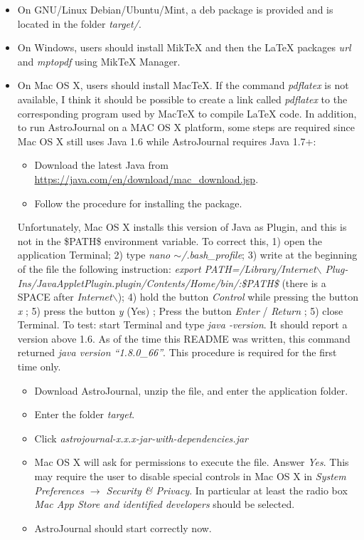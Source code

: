 \begin{itemize}
 \item On GNU/Linux Debian/Ubuntu/Mint, a deb package is provided and is located in the folder \textit{target/}.
 \item On Windows, users should install MikTeX and then the LaTeX packages \textit{url} and \textit{mptopdf} using MikTeX Manager.
 \item On Mac OS X, users should install MacTeX. If the command \textit{pdflatex} is not available, I think it should be possible to create a link called \textit{pdflatex} to the corresponding program used by MacTeX to compile LaTeX code. In addition, to run AstroJournal on a MAC OS X platform, some steps are required since Mac OS X still uses Java 1.6 while AstroJournal requires Java 1.7+: 
\begin{itemize}
 \item Download the latest Java from\\ \href{https://java.com/en/download/mac\_download.jsp}{https://java.com/en/download/mac\_download.jsp}.
 \item Follow the procedure for installing the package.
\end{itemize}
Unfortunately, Mac OS X installs this version of Java as Plugin, and this is not in the \$PATH\$ environment variable. To correct this, 1) open the application Terminal; 2) type \textit{nano $\sim$/.bash\_profile}; 3) write at the beginning of the file the following instruction: \textit{export PATH=/Library/Internet$\backslash$ Plug-Ins/JavaAppletPlugin.plugin/Contents/Home/bin/:\$PATH\$} (there is a SPACE after \textit{Internet$\backslash$}); 4) hold the button \textit{Control} while pressing the button \textit{x} ; 5) press the button \textit{y} (Yes) ; Press the button \textit{Enter} / \textit{Return} ; 5) close Terminal. To test: start Terminal and type \textit{java -version}. It should report a version above 1.6. As of the time this README was written, this command returned \textit{java version ``1.8.0\_66''}. This procedure is required for the first time only. 
\begin{itemize}
 \item Download AstroJournal, unzip the file, and enter the application folder.
 \item Enter the folder \textit{target}.
 \item Click \textit{astrojournal-x.x.x-jar-with-dependencies.jar}
 \item Mac OS X will ask for permissions to execute the file. Answer \textit{Yes}. This may require the user to disable special controls in Mac OS X in \textit{System Preferences $\rightarrow$ Security \& Privacy}. In particular at least the radio box \textit{Mac App Store and identified developers} should be selected. 
 \item AstroJournal should start correctly now.
\end{itemize}

\end{itemize}


